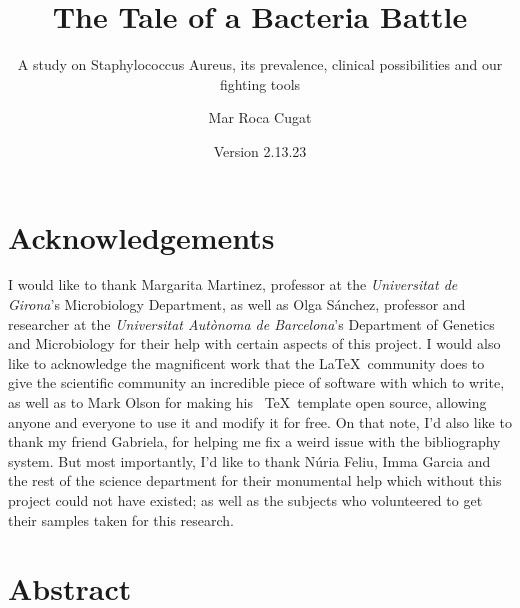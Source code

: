 \documentclass[fontsize=12pt,twoside=semi,openright,numbers=noenddot,parskip=half]{scrbook}
\title{The Tale of a Bacteria Battle}
\subtitle{A study on Staphylococcus Aureus, its prevalence, clinical possibilities and our fighting tools}
\author{Mar Roca Cugat}
\date{Version 2.13.23}
\begin{document}
\maketitle
\cleardoublepage
\renewcommand{\thepage}{\arabic{page}}
\frontmatter
\chapter{Acknowledgements}
\begin{center}
I would like to thank Margarita Martinez, professor at the \emph{Universitat de Girona}'s Microbiology Department, as well as Olga Sánchez, professor and researcher at the \emph{Universitat Autònoma de Barcelona}'s Department of Genetics and Microbiology for their help with certain aspects of this project. \newline
I would also like to acknowledge the magnificent work that the \LaTeX\ community does to give the scientific community an incredible piece of software with which to write, as well as to Mark Olson for making his \KOMAScript\ \TeX\ template open source, allowing anyone and everyone to use it and modify it for free. On that note, I'd also like to thank my friend Gabriela, for helping me fix a weird issue with the bibliography system.\newline
But most importantly, I'd like to thank Núria Feliu, Imma Garcia and the rest of the science department for their monumental help which without this project could not have existed; as well as the subjects who volunteered to get their samples taken for this research.\newline
\end{center}
\chapter{Abstract}
\end{document}
